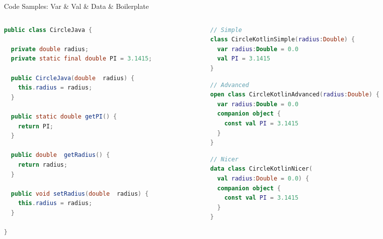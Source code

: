 \begin{frame}[fragile]{Code Samples: Var \& Val \& Data \& Boilerplate}
	\begin{columns}
		\begin{column}{0.5\textwidth}
\begin{lstlisting}[language=java,basicstyle=\ttfamily\tiny]
public class CircleJava {

  private double radius;
  private static final double PI = 3.1415;

  public CircleJava(double  radius) {
    this.radius = radius;
  }

  public static double getPI() {
    return PI;
  }

  public double  getRadius() {
    return radius;
  }

  public void setRadius(double  radius) {
    this.radius = radius;
  }

}
\end{lstlisting}
		\end{column}
		\begin{column}{0.5\textwidth}
\begin{lstlisting}[language=Kotlin,basicstyle=\ttfamily\tiny]
// Simple
class CircleKotlinSimple(radius:Double) {
  var radius:Double = 0.0
  val PI = 3.1415
}
\end{lstlisting}
\begin{lstlisting}[language=Kotlin,basicstyle=\ttfamily\tiny]
// Advanced
open class CircleKotlinAdvanced(radius:Double) {
  var radius:Double = 0.0
  companion object {
    const val PI = 3.1415
  }
}
\end{lstlisting}
\begin{lstlisting}[language=Kotlin,basicstyle=\ttfamily\tiny]
// Nicer
data class CircleKotlinNicer(
  val radius:Double = 0.0) {
  companion object {
    const val PI = 3.1415
  }
}
\end{lstlisting}
		\end{column}
	\end{columns}
\end{frame}

